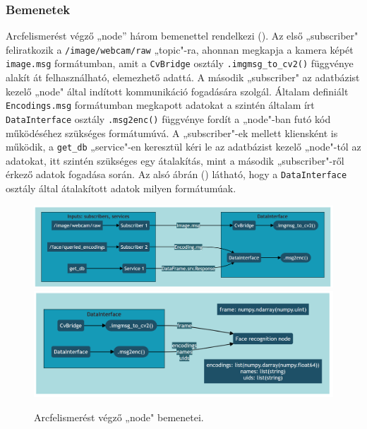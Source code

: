 \subsubsection{Bemenetek}
Arcfelismerést végző „node” három bemenettel rendelkezi (). Az első „subscriber" feliratkozik a \verb|/image/webcam/raw| „topic"-ra, ahonnan megkapja a kamera képét \verb|image.msg| formátumban, amit a \verb|CvBridge| osztály \verb|.imgmsg_to_cv2()| függvénye alakít át felhasználható, elemezhető adattá. A második „subscriber" az adatbázist kezelő „node" által indított kommunikáció fogadására szolgál. Általam definiált \verb|Encodings.msg| formátumban megkapott adatokat a szintén általam írt \verb|DataInterface| osztály \verb|.msg2enc()| függvénye fordít a „node"-ban futó kód működéséhez szükséges formátumúvá. A „subscriber"-ek mellett kliensként is működik, a \verb|get_db| „service"-en keresztül kéri le az adatbázist kezelő „node"-tól az adatokat, itt szintén szükséges egy átalakítás, mint a második „subscriber"-ről érkező adatok fogadása során. Az alsó ábrán () látható, hogy a \verb|DataInterface| osztály által átalakított adatok milyen formátumúak.
\begin{figure}[!ht]
    \centering
    \includegraphics[width=150mm, keepaspectratio]{02_mermaid/fr_bemenet1.png}
    \includegraphics[width=151mm, keepaspectratio]{02_mermaid/fr_bemenet2.png}
    \caption{Arcfelismerést végző „node" bemenetei.}
    \label{fig:fri}
\end{figure}

